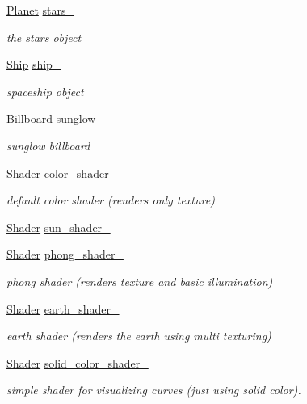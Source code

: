 \begin{DoxyCompactItemize}
\hyperlink{classPlanet}{Planet} \hyperlink{classSolar__viewer_aeaeb8ed645d3e4a14ac8cda157472f39}{stars\+\_\+}
\begin{DoxyCompactList}\small\item\em the stars object \end{DoxyCompactList}\item 
\hyperlink{classShip}{Ship} \hyperlink{classSolar__viewer_a15b5951427b3a4abad4715255c94f2bd}{ship\+\_\+}
\begin{DoxyCompactList}\small\item\em spaceship object \end{DoxyCompactList}\item 
\hyperlink{classBillboard}{Billboard} \hyperlink{classSolar__viewer_a6a7e25827438c0e43f17e53d28041a79}{sunglow\+\_\+}
\begin{DoxyCompactList}\small\item\em sunglow billboard \end{DoxyCompactList}\item 
\hyperlink{classShader}{Shader} \hyperlink{classSolar__viewer_aed950d77f461e1ce32ba1dcf3898b814}{color\+\_\+shader\+\_\+}
\begin{DoxyCompactList}\small\item\em default color shader (renders only texture) \end{DoxyCompactList}\item 
\hyperlink{classShader}{Shader} \hyperlink{classSolar__viewer_a2b1a9a122bcbeebae265b49a1d048154}{sun\+\_\+shader\+\_\+}
\item 
\hyperlink{classShader}{Shader} \hyperlink{classSolar__viewer_a3f0eaae53b84778ce774d1c2ced29b9f}{phong\+\_\+shader\+\_\+}
\begin{DoxyCompactList}\small\item\em phong shader (renders texture and basic illumination) \end{DoxyCompactList}\item 
\hyperlink{classShader}{Shader} \hyperlink{classSolar__viewer_a5a423c2328fd2d79de95a2a270b385e3}{earth\+\_\+shader\+\_\+}
\begin{DoxyCompactList}\small\item\em earth shader (renders the earth using multi texturing) \end{DoxyCompactList}\item 
\hyperlink{classShader}{Shader} \hyperlink{classSolar__viewer_a3d36d3fc4b3e1cf447cf8ff087f0ab0e}{solid\+\_\+color\+\_\+shader\+\_\+}
\begin{DoxyCompactList}\small\item\em simple shader for visualizing curves (just using solid color). \end{DoxyCompactList}\item 

\end{DoxyCompactItemize}
